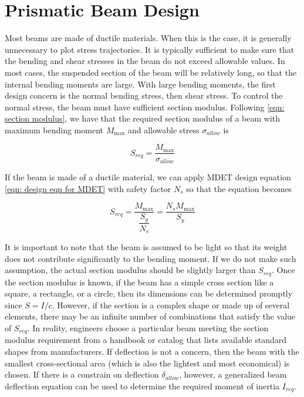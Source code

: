 \documentclass[
10pt,
a4paper,
openany,
svgnames,
]{book}
\begin{document}
\section{Prismatic Beam Design}

Most beams are made of ductile materials. When this is the case, it is generally unnecessary to plot stress trajectories. It is typically sufficient to make sure that the bending and shear stresses in the beam do not exceed allowable values. In most cases, the suspended section of the beam will be relatively long, so that the internal bending moments are large. With large bending moments, the first design concern is the normal bending stress, then shear stress. To control the normal stress, the beam must have sufficient section modulus. Following \cref{eqn: section modulus}, we have that the required section modulus of a beam with maximum bending moment $M_{\max}$ and allowable stress $\sigma_{allow}$ is

\begin{equation} \label{eqn: beam required section}
  S_{req} = \frac{M_{\max}}{\sigma_{allow}}
\end{equation}

If the beam is made of a ductile material, we can apply MDET design equation \eqref{eqn: design eqn for MDET} with safety factor $N_s$ so that the equation becomes

\begin{equation}
  \label{eq: ductile beam design equation}
  S_{req} = \frac{M_{\max}}{\dfrac{S_y}{N_s}} = \frac{N_s M_{\max}}{S_y}
\end{equation}

It is important to note that the beam is assumed to be light so that its weight does not contribute significantly to the bending moment. If we do not make such assumption, the actual section modulus should be slightly larger than $S_{req}$. Once the section modulus is known, if the beam has a simple cross section like a square, a rectangle, or a circle, then its dimensions can be determined promptly since $S = I/c$. However, if the section is a complex shape or made up of several elements, there may be an infinite number of combinations that satisfy the value of $S_{req}$. In reality, engineers choose a particular beam meeting the section modulus requirement from a handbook or catalog that lists available standard shapes from manufacturers. If deflection is not a concern, then the beam with the smallest cross-sectional area (which is also the lightest and most economical) is chosen. If there is a constrain on deflection $\delta_{allow}$, however, a generalized beam deflection equation can be used to determine the required moment of inertia $I_{req}$.
\end{document}
